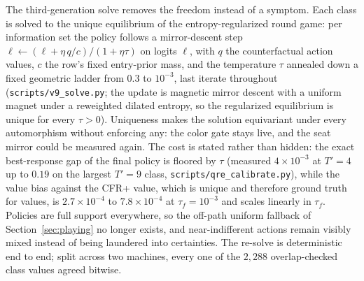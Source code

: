 \documentclass[11pt]{article}
\theoremstyle{plain}
\theoremstyle{definition}
\theoremstyle{remark}
\begin{document}
The third-generation solve removes the freedom instead of a symptom.
Each class is solved to the unique equilibrium of the
entropy-regularized round game: per information set the policy follows
a mirror-descent step
$\ell \leftarrow (\ell + \eta\, q / c) / (1 + \eta\tau)$ on logits
$\ell$, with $q$ the counterfactual action values, $c$ the row's fixed
entry-prior mass, and the temperature $\tau$ annealed down a fixed
geometric ladder from $0.3$ to $10^{-3}$, last iterate throughout
(\texttt{scripts/v9\_solve.py}; the update is magnetic mirror descent
with a uniform magnet under a reweighted dilated entropy, so the
regularized equilibrium is unique for every $\tau>0$). Uniqueness makes
the solution equivariant under every automorphism without enforcing
any: the color gate stays live, and the seat mirror could be measured
again. The cost is stated rather than hidden: the exact best-response
gap of the final policy is floored by $\tau$ (measured
$4\times10^{-3}$ at $T'{=}4$ up to $0.19$ on the largest $T'{=}9$
class, \texttt{scripts/qre\_calibrate.py}), while the value bias
against the CFR+ value, which is unique and therefore ground truth for
values, is $2.7\times10^{-4}$ to $7.8\times10^{-4}$ at
$\tau_f=10^{-3}$ and scales linearly in $\tau_f$. Policies are full
support everywhere, so the off-path uniform fallback of
Section~\ref{sec:playing} no longer exists, and near-indifferent
actions remain visibly mixed instead of being laundered into
certainties. The re-solve is deterministic end to end; split across
two machines, every one of the $2{,}288$ overlap-checked class values
agreed bitwise.
\end{document}
